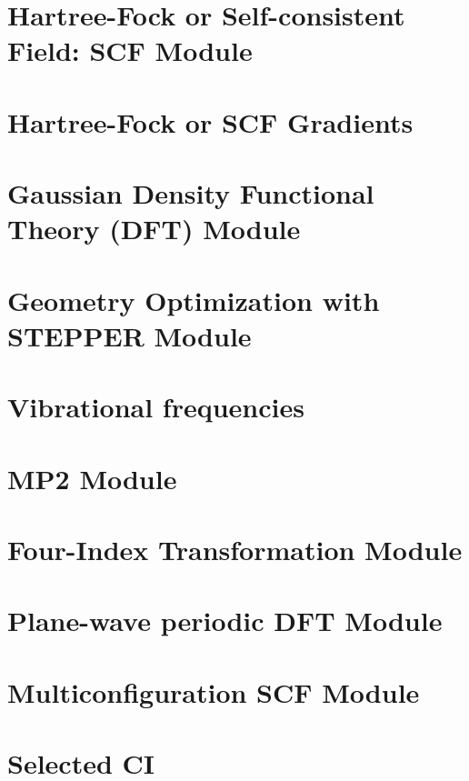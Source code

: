 \section{Hartree-Fock or Self-consistent Field: SCF Module} 


\section{Hartree-Fock or SCF Gradients}


\section{Gaussian Density Functional Theory (DFT) Module}


\section{Geometry Optimization with STEPPER Module}


\section{Vibrational frequencies}


\section{MP2 Module}


\section{Four-Index Transformation Module} 


\section{Plane-wave periodic DFT Module}


\section{Multiconfiguration SCF Module}


\section{Selected CI}




